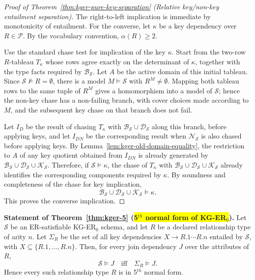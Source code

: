 \documentclass[10pt]{article}
\begin{document}
\begin{proof}[Proof of Theorem~\ref{thm:kger-pure-key-separation} (Relative key/non-key entailment separation)]
The right-to-left implication is immediate by monotonicity of entailment.
For the converse, let \(\kappa\) be a key dependency over
\(R\in\mathcal P\).  By the vocabulary convention,
\(\alpha(R)\geq2\).

Use the standard chase test for implication of the key \(\kappa\).  Start
from the two-row \(R\)-tableau \(T_\kappa\) whose rows agree exactly on
the determinant of \(\kappa\), together with the type facts required by
\(\mathcal B_{\mathcal S}\).  Let \(A\) be the active domain of this
initial tableau.
Since \(\mathcal S\not\models R=\emptyset\), there is a model
\(M\models\mathcal S\) with \(R^M\neq\emptyset\).  Mapping both tableau
rows to the same tuple of \(R^M\) gives a homomorphism into a model of
\(\mathcal S\); hence the non-key chase has a non-failing branch, with
cover choices made according to \(M\), and the subsequent key chase on
that branch does not fail.

Let \(I_D\) be the result of chasing \(T_\kappa\) with
\(\mathcal B_{\mathcal S}\cup\mathcal D_{\mathcal S}\) along this branch,
before applying keys, and let \(I_{DN}\) be the corresponding result
when \(\mathcal N_{\mathcal S}\) is also chased before applying keys.
By Lemma~\ref{lem:kger-old-domain-equality}, the restriction to \(A\) of
any key quotient obtained from \(I_{DN}\) is already generated by
\(\mathcal B_{\mathcal S}\cup\mathcal D_{\mathcal S}\cup
\mathcal K_{\mathcal S}\).  Therefore, if
\(\mathcal S\models\kappa\), the chase of \(T_\kappa\) with
\(\mathcal B_{\mathcal S}\cup\mathcal D_{\mathcal S}\cup
\mathcal K_{\mathcal S}\) already identifies the corresponding
components required by \(\kappa\).  By soundness and completeness of the
chase for key implication,
\[
\mathcal B_{\mathcal S}\cup\mathcal D_{\mathcal S}\cup
\mathcal K_{\mathcal S}\models\kappa .
\]
This proves the converse implication.
\end{proof}

\noindent\textbf{Statement of Theorem~\ref{thm:kger-5} (\colorbox{yellow}{5$^{th}$ normal form of KG-ER$_0$}).}
Let \(\mathcal S\) be an ER-satisfiable KG-ER\(_0\) schema, and let
\(R\) be a declared relationship type of arity \(n\).  Let
\(\Sigma_R\) be the set of all key dependencies
\(X\to R.1\cdots R.n\) entailed by \(\mathcal S\), with
\(X\subseteq\{R.1,\ldots,R.n\}\).  Then, for every join
dependency \(J\) over the attributes of \(R\),
\[
\mathcal S\models J
\quad\text{iff}\quad
\Sigma_R\models J .
\]
Hence every such relationship type \(R\) is in 5$^{th}$ normal form.
\end{document}
